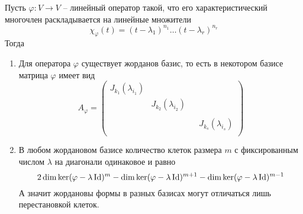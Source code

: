 \begin{claim}\label{claim::JNF}
Пусть $\varphi\colon V\to V$ -- линейный оператор такой, что его характеристический многочлен раскладывается на линейные множители
\[
\chi_\varphi(t) = (t - \lambda_1)^{n_1} \ldots (t - \lambda_r)^{n_r}
\]
Тогда
\begin{enumerate}
\item Для оператора $\varphi$ существует жорданов базис, то есть в некотором базисе матрица $\varphi$ имеет вид
\[
A_\varphi = 
\begin{pmatrix}
{J_{k_1}(\lambda_{i_1})}&{}&{}&{}\\
{}&{J_{k_2}(\lambda_{i_2})}&{}&{}\\
{}&{}&{}&{}\\
{}&{}&{}&{J_{k_s}(\lambda_{i_s})}\\
\end{pmatrix}
\]
\item В любом жордановом базисе количество клеток размера $m$ с фиксированным числом $\lambda$ на диагонали одинаковое и равно
\[
2\dim \ker (\varphi - \lambda\operatorname{Id})^m - \dim \ker (\varphi - \lambda\operatorname{Id})^{m+1} - \dim \ker (\varphi - \lambda\operatorname{Id})^{m-1}
\]
А значит жордановы формы в разных базисах могут отличаться лишь перестановкой клеток.
\end{enumerate}
\end{claim}
